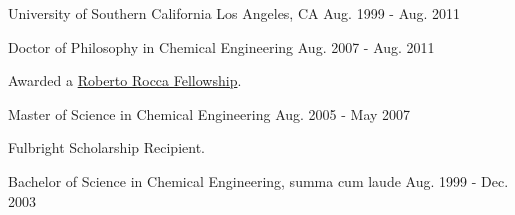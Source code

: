 

\begin{cventries}

\cvmultientry
{University of Southern California} %
{Los Angeles, CA}
{Aug. 1999 - Aug. 2011} %
{
\cvsubentry
{Doctor of Philosophy in Chemical Engineering} %
{} %
{Aug. 2007 - Aug. 2011} %
{
  \begin{cvitems} %
    \item  Awarded a {\href{http://www.robertorocca.org/en/fellowships/fellows07.aspx}{Roberto Rocca Fellowship}}.
  \end{cvitems}
}
\cvsubentry
{Master of Science in Chemical Engineering} %
{} %
{Aug. 2005 - May 2007} %
{
  \begin{cvitems} %
    \item Fulbright Scholarship Recipient.
  \end{cvitems}
}
  \cvsubentry
      {Bachelor of Science in Chemical Engineering, summa cum laude} %
      {} %
      {Aug. 1999 - Dec. 2003} %
      {}
}

\end{cventries}
